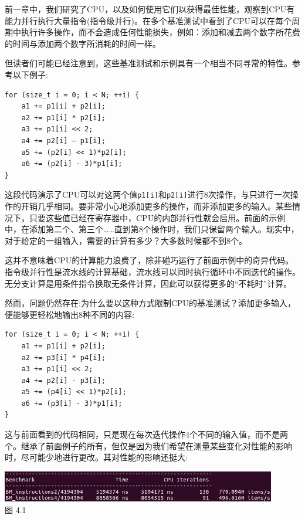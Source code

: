 
前一章中，我们研究了CPU，以及如何使用它们以获得最佳性能，观察到CPU有能力并行执行大量指令(指令级并行)。在多个基准测试中看到了CPU可以在每个周期中执行许多操作，而不会造成任何性能损失，例如：添加和减去两个数字所花费的时间与添加两个数字所消耗的时间一样。

但读者们可能已经注意到，这些基准测试和示例具有一个相当不同寻常的特性。参考以下例子:

\begin{lstlisting}[style=styleCXX]
for (size_t i = 0; i < N; ++i) {
	a1 += p1[i] + p2[i];
	a2 += p1[i] * p2[i];
	a3 += p1[i] << 2;
	a4 += p2[i] – p1[i];
	a5 += (p2[i] << 1)*p2[i];
	a6 += (p2[i] - 3)*p1[i];
}
\end{lstlisting}

这段代码演示了CPU可以对这两个值\texttt{p1[i]}和\texttt{p2[i]}进行8次操作，与只进行一次操作的开销几乎相同。要非常小心地添加更多的操作，而非添加更多的输入。某些情况下，只要这些值已经在寄存器中，CPU的内部并行性就会启用。前面的示例中，在添加第二个、第三个……直到第8个操作时，我们只保留两个输入。现实中，对于给定的一组输入，需要的计算有多少？大多数时候都不到8个。

这并不意味着CPU的计算能力浪费了，除非碰巧运行了前面示例中的奇异代码。指令级并行性是流水线的计算基础，流水线可以同时执行循环中不同迭代的操作。无分支计算是用条件指令换取无条件计算，因此可以获得更多的“不耗时”计算。

然而，问题仍然存在:为什么要以这种方式限制CPU的基准测试？添加更多输入，便能够更轻松地输出8种不同的内容:

\begin{lstlisting}[style=styleCXX]
for (size_t i = 0; i < N; ++i) {
	a1 += p1[i] + p2[i];
	a2 += p3[i] * p4[i];
	a3 += p1[i] << 2;
	a4 += p2[i] - p3[i];
	a5 += (p4[i] << 1)*p2[i];
	a6 += (p3[i] - 3)*p1[i];
}
\end{lstlisting}

这与前面看到的代码相同，只是现在每次迭代操作4个不同的输入值，而不是两个。继承了前面例子的所有，但仅是因为我们希望在测量某些变化对性能的影响时，尽可能少地进行更改。其对性能的影响还挺大:

\begin{center}
\includegraphics[width=0.9\textwidth]{content/1/chapter4/images/1.jpg}\\
图 4.1
\end{center}

